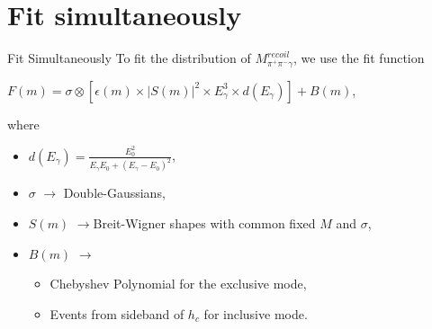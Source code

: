 \documentclass{beamer}
\begin{document}
\section{Fit simultaneously}
\begin{frame}{Fit Simultaneously}
    To fit the distribution of $M^{recoil}_{\pi^+\pi^-\gamma}$, we use the fit function\\
    \begin{center}
            $F(m) = \sigma\otimes[\epsilon(m)\times|S(m)|^2\times E^3_{\gamma}\times d(E_{\gamma})] + B(m)$,
    \end{center}
    where
    \begin{itemize}
        \item $d(E_{\gamma}) = \frac{E^2_0}{E_{\gamma}E_0 + ( E_{\gamma}-E_0 )^2}$,\\
        \item $\sigma$ $\rightarrow$ Double-Gaussians,
        \item $S(m)$ $\rightarrow $Breit-Wigner shapes with common fixed $M$ and $\sigma$,
        \item $B(m)$ $\rightarrow $
            \begin{itemize}
                \item Chebyshev Polynomial for the exclusive mode,
                \item Events from sideband of $h_c$ for inclusive mode.
            \end{itemize}
    \end{itemize}
\end{frame}

\end{document}
